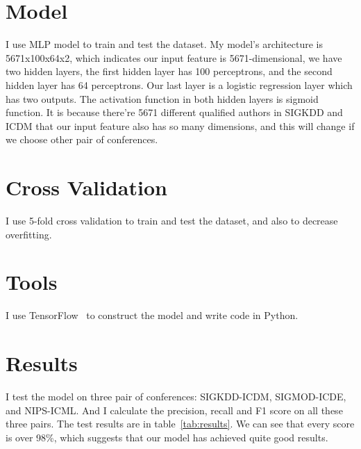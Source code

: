 \documentclass{sigkddExp}
\begin{document}
\section{Model}
I use MLP model to train and test the dataset. My model's architecture is 
5671x100x64x2, which indicates our input feature is 5671-dimensional, we
have two hidden layers, the first hidden layer has 100 perceptrons, and the
second hidden layer has 64 perceptrons. Our last layer is a logistic regression
layer which has two outputs. The activation function in both hidden layers is
sigmoid function. It is because there're 5671 different qualified authors in SIGKDD and 
ICDM that our input feature also has so many dimensions, and this will change
if we choose other pair of conferences.

\section{Cross Validation}
I use 5-fold cross validation to train and test the dataset, and also to decrease
overfitting.

\section{Tools}
I use TensorFlow~\cite{tensorflow2015-whitepaper} to construct the model and write code
in Python.
%

\section{Results}
I test the model on three pair of conferences: SIGKDD-ICDM, SIGMOD-ICDE,
and NIPS-ICML. And I calculate the precision, recall and F1 score on all
these three pairs. The test results are in table~\ref{tab:results}.
We can see that every score is over 98\%, which suggests that our model
has achieved quite good results.
\end{document}
